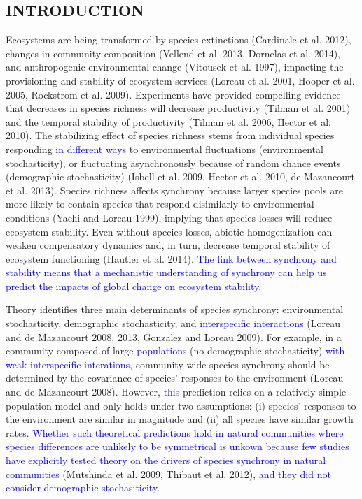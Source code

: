 \documentclass[12pt,]{article}
\begin{document}
\newpage{} \setlength{\parindent}{5ex}

\subsection{INTRODUCTION}\label{introduction}

Ecosystems are being transformed by species extinctions (Cardinale et
al. 2012), changes in community composition (Vellend et al. 2013,
Dornelas et al. 2014), and anthropogenic environmental change (Vitousek
et al. 1997), impacting the provisioning and stability of ecosystem
services (Loreau et al. 2001, Hooper et al. 2005, Rockstrom et al.
2009). Experiments have provided compelling evidence that decreases in
species richness will decrease productivity (Tilman et al. 2001) and the
temporal stability of productivity (Tilman et al. 2006, Hector et al.
2010). The stabilizing effect of species richness stems from individual
species responding \textcolor{blue}{in different ways} to environmental
fluctuations (environmental stochasticity), or fluctuating
asynchronously because of random chance events (demographic
stochasticity) (Isbell et al. 2009, Hector et al. 2010, {{de
Mazancourt}} et al. 2013). Species richness affects synchrony because
larger species pools are more likely to contain species that respond
disimilarly to environmental conditions (Yachi and Loreau 1999),
implying that species losses will reduce ecosystem stability. Even
without species losses, abiotic homogenization can weaken compensatory
dynamics and, in turn, decrease temporal stability of ecosystem
functioning (Hautier et al. 2014).
\textcolor{blue}{The link between synchrony and stability means that a mechanistic understanding of synchrony can help us predict the impacts of global change on ecosystem stability.}

Theory identifies three main determinants of species synchrony:
environmental stochasticity, demographic stochasticity, and
\textcolor{blue}{interspecific interactions} (Loreau and {{de
Mazancourt}} 2008, 2013, Gonzalez and Loreau 2009). For example, in a
community composed of large \textcolor{blue}{populations} (no
demographic stochasticity)
\textcolor{blue}{with weak interspecific interations}, community-wide
species synchrony should be determined by the covariance of species'
responses to the environment (Loreau and {{de Mazancourt}} 2008).
However, \textcolor{blue}{this} prediction relies on a relatively simple
population model and only holds under two assumptions: (i) species'
responses to the environment are similar in magnitude and (ii) all
species have similar growth rates.
\textcolor{blue}{Whether such theoretical predictions hold in natural communities where species differences are unlikely to be symmetrical is unkown because few studies have explicitly tested theory on the drivers of species synchrony in natural communities}
(Mutshinda et al. 2009, Thibaut et al. 2012),
\textcolor{blue}{and they did not consider demographic stochasiticity.}
\end{document}
